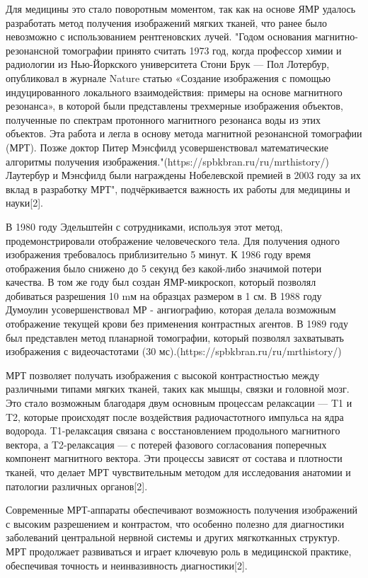 Для медицины это стало поворотным моментом, так как на основе ЯМР удалось разработать метод получения изображений мягких тканей, что ранее было невозможно с использованием рентгеновских лучей. "Годом основания магнитно-резонансной томографии принято считать 1973 год, когда профессор химии и радиологии из Нью-Йоркского университета Стони Брук — Пол Лотербур, опубликовал в журнале Nature статью «Создание изображения с помощью индуцированного локального взаимодействия: примеры на основе магнитного резонанса», в которой были представлены трехмерные изображения объектов, полученные по спектрам протонного магнитного резонанса воды из этих объектов. Эта работа и легла в основу метода магнитной резонансной томографии (МРТ). Позже доктор Питер Мэнсфилд усовершенствовал математические алгоритмы получения изображения."(https://spbkbran.ru/ru/mrthistory/)  Лаутербур и Мэнсфилд были награждены Нобелевской премией в 2003 году за их вклад в разработку МРТ", подчёркивается важность их работы для медицины и науки[2].

В 1980 году Эдельштейн с сотрудниками, используя этот метод, продемонстрировали отображение человеческого тела. Для получения одного изображения требовалось приблизительно 5 минут. К 1986 году время отображения было снижено до 5 секунд без какой-либо значимой потери качества. В том же году был создан ЯМР-микроскоп, который позволял добиваться разрешения 10 mм на образцах размером в 1 см. В 1988 году Думоулин усовершенствовал МР - ангиографию, которая делала возможным отображение текущей крови без применения контрастных агентов. В 1989 году был представлен метод планарной томографии, который позволял захватывать изображения с видеочастотами (30 мс).(https://spbkbran.ru/ru/mrthistory/)  

МРТ позволяет получать изображения с высокой контрастностью между различными типами мягких тканей, таких как мышцы, связки и головной мозг. Это стало возможным благодаря двум основным процессам релаксации — T1 и T2, которые происходят после воздействия радиочастотного импульса на ядра водорода. T1-релаксация связана с восстановлением продольного магнитного вектора, а T2-релаксация — с потерей фазового согласования поперечных компонент магнитного вектора. Эти процессы зависят от состава и плотности тканей, что делает МРТ чувствительным методом для исследования анатомии и патологии различных органов[2].

Современные МРТ-аппараты обеспечивают возможность получения изображений с высоким разрешением и контрастом, что особенно полезно для диагностики заболеваний центральной нервной системы и других мягкотканных структур. МРТ продолжает развиваться и играет ключевую роль в медицинской практике, обеспечивая точность и неинвазивность диагностики[2].
